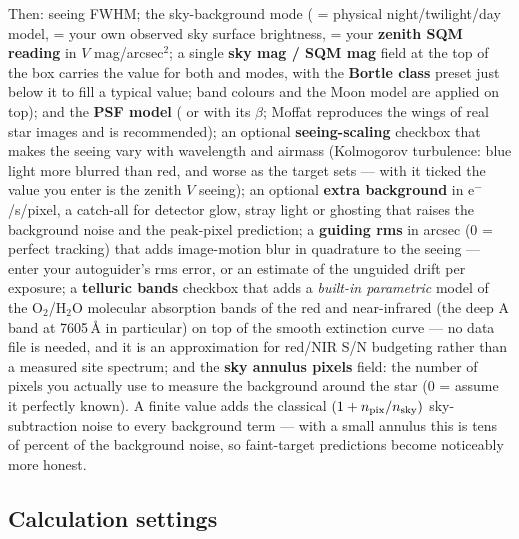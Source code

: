 Then: seeing FWHM; the sky-background mode
( = physical night/twilight/day model,  = your
own observed sky surface brightness,  = your \textbf{zenith SQM
reading} in $V$ mag/arcsec$^2$; a single \textbf{sky mag / SQM mag} field
at the top of the box carries the value for both  and
 modes, with the \textbf{Bortle class} preset just below it to
fill a typical value; band colours and the Moon model are applied on
top); and the \textbf{PSF model} ( or  with
its $\beta$; Moffat reproduces the wings of real star images and is
recommended); an optional \textbf{seeing-scaling} checkbox that makes the
seeing vary with wavelength and airmass (Kolmogorov turbulence: blue light
more blurred than red, and worse as the target sets --- with it ticked the
value you enter is the zenith $V$ seeing); an optional \textbf{extra
background} in e$^-$/s/pixel, a catch-all for detector glow, stray light or
ghosting that raises the background noise and the peak-pixel prediction;
a \textbf{guiding rms} in arcsec (0 = perfect tracking) that adds
image-motion blur in quadrature to the seeing --- enter your autoguider's
rms error, or an estimate of the unguided drift per exposure; a
\textbf{telluric bands} checkbox that adds a \emph{built-in parametric}
model of the O$_2$/H$_2$O molecular absorption bands of the red and
near-infrared (the deep A band at 7605\,\AA{} in particular) on top of the
smooth extinction curve --- no data file is needed, and it is an
approximation for red/NIR S/N budgeting rather than a measured site
spectrum; and the
\textbf{sky annulus pixels} field: the number of pixels you actually use
to measure the background around the star (0 = assume it perfectly
known). A finite value adds the classical $(1+n_{\rm pix}/n_{\rm sky})$
sky-subtraction noise to every background term --- with a small annulus
this is tens of percent of the background noise, so faint-target
predictions become noticeably more honest.

\subsection{Calculation settings}

